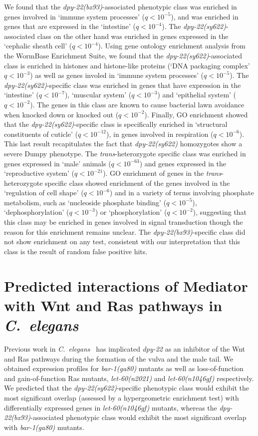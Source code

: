 \documentclass[9pt,twocolumn,twoside]{gsajnl}
\newcommand{\qval}[1]{$q<10^{-#1}$}
\newcommand{\cel}{\emph{C.~elegans}}
\newcommand{\gene}[1]{\mbox{\emph{#1}}}
\newcommand{\dpy}[1]{\gene{dpy-22#1}}
\newcommand{\bx}{\dpy{(bx93)}}
\newcommand{\sy}{\dpy{(sy622)}}
\begin{document}
We found that the \bx{}-associated phenotypic class was enriched in genes
involved in `immune system processes' (\qval{5}), and was enriched in genes that
are expressed in the `intestine' (\qval{4}). The \sy{}-associated class on the
other hand was enriched in genes expressed in the `cephalic sheath cell'
(\qval{4}). Using gene ontology enrichment analysis from the WormBase Enrichment
Suite, we found that the \sy{}-associated class is enriched in histones and
histone-like proteins (`DNA packaging complex' \qval{3}) as well as genes
involed in `immune system processes' (\qval{5}). The \sy{}-specific class was
enriched in genes that have expression in the `intestine' (\qval{7}), `muscular
system' (\qval{3}) and `epithelial system' (\qval{2}). The genes in this class
are known to cause bacterial lawn avoidance when knocked down or knocked out
(\qval{2}). Finally, GO enrichment showed that the \sy{}-specific class is
specifically enriched in `structural constituents of cuticle' (\qval{12}),
in genes involved in respiration (\qval{6}). This last result recapitulates the
fact that \sy{} homozygotes show a severe Dumpy phenotype. The
\emph{trans}-heterozygote specific class was enriched in genes expressed in
`male' animals (\qval{63}) and genes expressed in the `reproductive system'
(\qval{21}). GO enrichment of genes in the \emph{trans}-heterozygote specific
class showed enrichment of the genes involved in the `regulation of cell shape'
(\qval{6}) and in a variety of terms involving phosphate metabolism, such as
`nucleoside phosphate binding' (\qval{5}), `dephosphorylation' (\qval{3}) or
`phosphorylation' (\qval{2}), suggesting that this class may be enriched in
genes involved in signal transduction though the reason for this enrichment
remains unclear. The \bx{}-specific class did not show enrichment on any test,
consistent with our interpretation that this class is the result of random false
positive hits.

\section*{Predicted interactions of Mediator with Wnt and Ras pathways in
          \cel{}}
Previous work in \cel{}~\citep{Moghal2003,Zhang2000} has implicated \dpy{} as an
inhibitor of the Wnt and Ras pathways during the formation of the vulva and the
male tail. We obtained expression profiles for \gene{bar-1(ga80)} mutants as
well as loss-of-function and gain-of-function Ras mutants, \gene{let-60(n2021)}
and \gene{let-60(n1046gf)} respectively. We predicted that the \sy{}-specific
phenotypic class would exhibit the most significant overlap (assessed by a
hypergeometric enrichment test) with differentially expressed genes in
\gene{let-60(n1046gf)} mutants, whereas the \bx{}-associated phenotypic class
would exhibit the most significant overlap with \gene{bar-1(ga80)} mutants.
\end{document}

